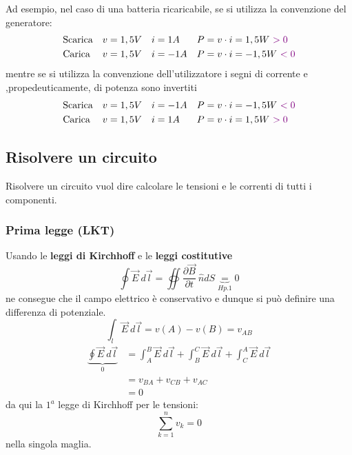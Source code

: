 \documentclass{article}
\begin{document}
Ad esempio, nel caso di una batteria ricaricabile, se si utilizza la convenzione del generatore:
\begin{align*}
    &\text{Scarica} & v&=1,5 V & i&=1A & P&=v\cdot i = 1,5W \ {\color{violet}>0}\\
    &\text{Carica} & v&=1,5 V & i&=-1A & P&=v\cdot i = -1,5W \ {\color{violet}<0}
\end{align*} 
mentre se si utilizza la convenzione dell'utilizzatore i segni di corrente e ,propedeuticamente, di potenza sono invertiti 
\begin{align*}
    &\text{Scarica} & v&=1,5 V & i&=-1A & P&=v\cdot i = -1,5W \ {\color{violet}<0}\\
    &\text{Carica} & v&=1,5 V & i&=1A & P&=v\cdot i = 1,5W \ {\color{violet}>0}
\end{align*} 


\subsection{Risolvere un circuito}
Risolvere un circuito vuol dire calcolare le tensioni e le correnti di tutti i componenti.
\subsubsection{Prima legge (LKT)}
Usando le \textbf{leggi di Kirchhoff} e le \textbf{leggi costitutive}
\[
    \oint \vec E \ d \vec l = \oiint \dfrac{\partial \vec B}{\partial t}\ \hat n dS \underbrace{=}_{Hp.1} 0
\]
ne consegue che il campo elettrico è conservativo e dunque si può definire una differenza di potenziale.
\[
    \int_l \vec E \ d \vec l = v(A) - v(B) = v_{AB}
\]
\begin{align*}
    \underbrace{\oint \vec E \ d \vec l}_{0} &= \int_{A}^{B} \vec E \ d\vec l + \int_{B}^{C} \vec E \ d\vec l + \int_{C}^{A} \vec E \ d\vec l \\
    &= v_{BA}+ v_{CB} + v_{AC} \\
    &= 0
\end{align*}
da qui la $1^a$ legge di Kirchhoff per le tensioni:
\[
    \sum_{k=1}^nv_k=0
\]
nella singola maglia.
\end{document}
